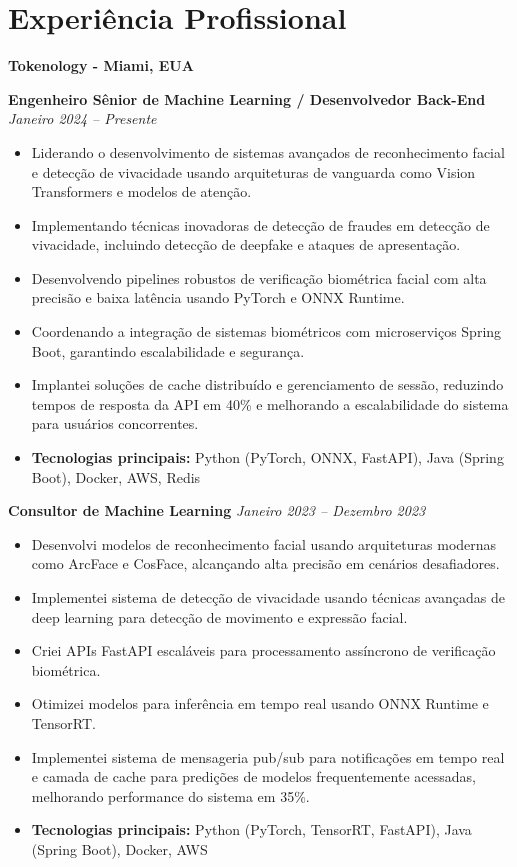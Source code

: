 \documentclass[12pt,a4paper,sans]{moderncv}
\begin{document}
\vspace{12pt}
\section{Experiência Profissional}

\vspace{3pt}

\vspace{24pt}
\small{\textbf{Tokenology - Miami, EUA}}
\vspace{3pt}

\textbf{Engenheiro Sênior de Machine Learning / Desenvolvedor Back-End} \hfill \textit{Janeiro 2024 -- Presente}
\begin{itemize}
    \item Liderando o desenvolvimento de sistemas avançados de reconhecimento facial e detecção de vivacidade usando arquiteturas de vanguarda como Vision Transformers e modelos de atenção.
    \item Implementando técnicas inovadoras de detecção de fraudes em detecção de vivacidade, incluindo detecção de deepfake e ataques de apresentação.
    \item Desenvolvendo pipelines robustos de verificação biométrica facial com alta precisão e baixa latência usando PyTorch e ONNX Runtime.
    \item Coordenando a integração de sistemas biométricos com microserviços Spring Boot, garantindo escalabilidade e segurança.
    \item Implantei soluções de cache distribuído e gerenciamento de sessão, reduzindo tempos de resposta da API em 40\% e melhorando a escalabilidade do sistema para usuários concorrentes.
    \item \textbf{Tecnologias principais:} Python (PyTorch, ONNX, FastAPI), Java (Spring Boot), Docker, AWS, Redis
\end{itemize}

\vspace{12pt}
\textbf{Consultor de Machine Learning} \hfill \textit{Janeiro 2023 -- Dezembro 2023}
\begin{itemize}
    \item Desenvolvi modelos de reconhecimento facial usando arquiteturas modernas como ArcFace e CosFace, alcançando alta precisão em cenários desafiadores.
    \item Implementei sistema de detecção de vivacidade usando técnicas avançadas de deep learning para detecção de movimento e expressão facial.
    \item Criei APIs FastAPI escaláveis para processamento assíncrono de verificação biométrica.
    \item Otimizei modelos para inferência em tempo real usando ONNX Runtime e TensorRT.
    \item Implementei sistema de mensageria pub/sub para notificações em tempo real e camada de cache para predições de modelos frequentemente acessadas, melhorando performance do sistema em 35\%.
    \item \textbf{Tecnologias principais:} Python (PyTorch, TensorRT, FastAPI), Java (Spring Boot), Docker, AWS
\end{itemize}
\end{document}
